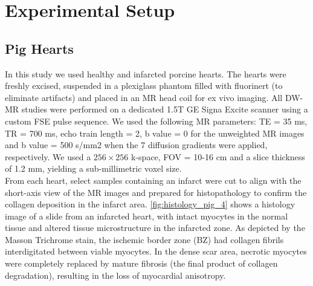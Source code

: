 
\chapter{Experimental Setup}

\section{Pig Hearts}

In this study we used healthy and infarcted porcine hearts. The hearts were freshly excised, suspended in a plexiglass phantom filled with fluorinert (to eliminate artifacts) and placed in an MR head coil for ex vivo imaging. All DW-MR studies were performed on a dedicated 1.5T GE Signa Excite scanner using a custom FSE pulse sequence. We used the following MR parameters: TE = 35 ms, TR = 700 ms, echo train length = 2, b value = 0 for the unweighted MR images and b value = 500 s/mm2 when the 7 diffusion gradients were applied, respectively. We used a $256 \times 256$ k-space, FOV = 10-16 cm and a slice thickness of 1.2 mm, yielding a sub-millimetric voxel size. \\
From each heart, select samples containing an infarct were cut to align with the short-axis view of the MR images and prepared for histopathology to confirm the collagen deposition in the infarct area. \ref{fig:histology_pig_4} shows a histology image of a slide from an infarcted heart, with intact myocytes in the normal tissue and altered tissue microstructure in the infarcted zone. As depicted by the Masson Trichrome stain, the ischemic border zone (BZ) had collagen fibrils interdigitated between viable myocytes. In the dense scar area, necrotic myocytes were completely replaced by mature fibrosis (the final product of collagen degradation), resulting in the loss of myocardial anisotropy.\\\\\\

